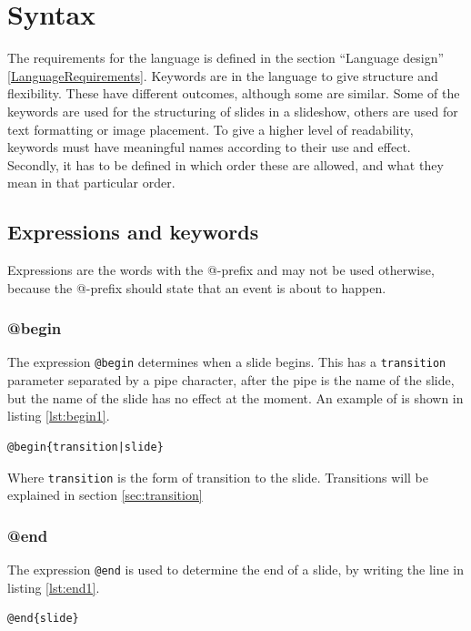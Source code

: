 \chapter{Syntax}
\label{SSyntax}

The requirements for the language is defined in the section ``Language design'' \ref{LanguageRequirements}. Keywords are in the language to give structure and flexibility. These have different outcomes, although some are similar. Some of the keywords are used for the structuring of slides in a slideshow, others are used for text formatting or image placement. To give a higher level of readability, keywords must have meaningful names according to their use and effect. Secondly, it has to be defined in which order these are allowed, and what they mean in that particular order.

\section{Expressions and keywords}
Expressions are the words with the @-prefix and may not be used otherwise, because the @-prefix should state that an event is about to happen.

\subsection{@begin}
\label{@begin}
The expression \texttt{@begin} determines when a slide begins. This has a \texttt{transition} parameter separated by a pipe character, after the pipe is the name of the slide, but the name of the slide has no effect at the moment. An example of is shown in listing \ref{lst:begin1}.
\begin{lstlisting}[frame=single, caption=begin expression generic, label=lst:begin1]
@begin{transition|slide}
\end{lstlisting}
Where \texttt{transition} is the form of transition to the slide. Transitions will be explained in section \ref{sec:transition}

\subsection{@end}
\label{@end}
The expression \texttt{@end} is used to determine the end of a slide, by writing the line in listing \ref{lst:end1}.
\begin{lstlisting}[frame=single, caption=end expression generic, label=lst:end1]
@end{slide}
\end{lstlisting}

